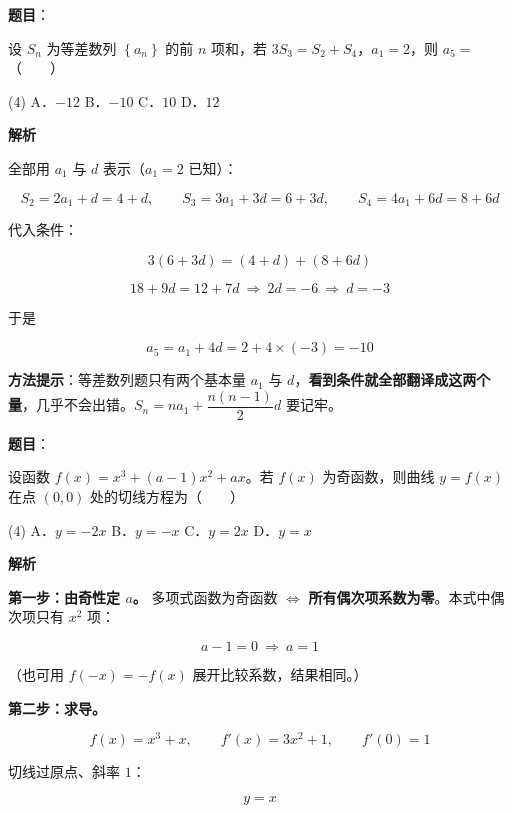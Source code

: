 \begin{answer}

\textbf{题目}：

设 $S_n$ 为等差数列 $\left\{a_n\right\}$ 的前 $n$ 项和，若 $3S_3=S_2+S_4$，$a_1=2$，则 $a_5=$\mbox{（　　）}

\begin{gkopts}(4)
\task A．$-12$
\task B．$-10$
\task C．$10$
\task D．$12$
\end{gkopts}

\textbf{解析}

全部用 $a_1$ 与 $d$ 表示（$a_1=2$ 已知）：

\nopagebreak[4]
\[S_2=2a_1+d=4+d,\qquad S_3=3a_1+3d=6+3d,\qquad S_4=4a_1+6d=8+6d\]

代入条件：

\nopagebreak[4]
\[3(6+3d)=(4+d)+(8+6d)\]

\nopagebreak[4]
\[18+9d=12+7d\ \Longrightarrow\ 2d=-6\ \Longrightarrow\ d=-3\]

于是

\nopagebreak[4]
\[a_5=a_1+4d=2+4\times(-3)=-10\]

\begin{gktip}
\textbf{方法提示}：等差数列题只有两个基本量 $a_1$ 与 $d$，\textbf{看到条件就全部翻译成这两个量}，几乎不会出错。$S_n=na_1+\dfrac{n(n-1)}2d$ 要记牢。
\end{gktip}


\par\medskip

\end{answer}
\begin{answer}

\textbf{题目}：

设函数 $f(x)=x^{3}+(a-1)x^{2}+ax$。若 $f(x)$ 为奇函数，则曲线 $y=f(x)$ 在点 $(0,0)$ 处的切线方程为\mbox{（　　）}

\begin{gkopts}(4)
\task A．$y=-2x$
\task B．$y=-x$
\task C．$y=2x$
\task D．$y=x$
\end{gkopts}

\textbf{解析}

\textbf{第一步：由奇性定 $a$。} 多项式函数为奇函数 $\iff$ \textbf{所有偶次项系数为零}。本式中偶次项只有 $x^{2}$ 项：

\nopagebreak[4]
\[a-1=0\ \Longrightarrow\ a=1\]

（也可用 $f(-x)=-f(x)$ 展开比较系数，结果相同。）

\textbf{第二步：求导。}

\nopagebreak[4]
\[f(x)=x^{3}+x,\qquad f'(x)=3x^{2}+1,\qquad f'(0)=1\]

切线过原点、斜率 $1$：

\nopagebreak[4]
\[y=x\]


\par\medskip

\end{answer}
